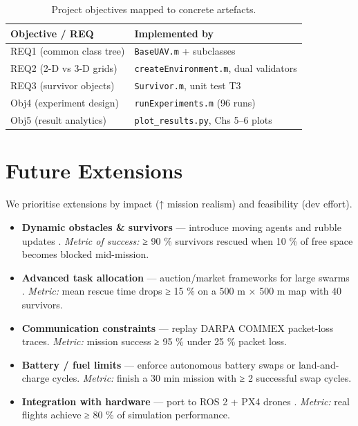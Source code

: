 \documentclass[12pt,a4paper]{report}
\begin{document}
\begin{table}[h]
  \centering
  \caption{Project objectives mapped to concrete artefacts.}
  \label{tab:obj2art}
  \begin{tabular}{@{}ll@{}}
    \toprule
    \textbf{Objective / REQ} & \textbf{Implemented by} \\
    \midrule
    REQ1 (common class tree)  & \texttt{BaseUAV.m} + subclasses \\
    REQ2 (2-D vs 3-D grids)   & \texttt{createEnvironment.m}, dual validators \\
    REQ3 (survivor objects)   & \texttt{Survivor.m}, unit test T3 \\
    Obj4 (experiment design)  & \texttt{runExperiments.m} (96 runs) \\
    Obj5 (result analytics)   & \texttt{plot\_results.py}, Chs 5–6 plots \\
    \bottomrule
  \end{tabular}
\end{table}

\section{Future Extensions}

We prioritise extensions by impact (↑ mission realism) and feasibility
(dev effort).

\begin{itemize}
  \item \textbf{Dynamic obstacles \& survivors} — introduce moving agents and
        rubble updates \cite{Oleynikova2018ReplanDynamic}.  
        \textit{Metric of success:} ≥ 90 \% survivors rescued when
        10 \% of free space becomes blocked mid-mission.
  \item \textbf{Advanced task allocation} — auction/market frameworks for large
        swarms \cite{Dias2006MarketBased,Gerkey2002SoldAuction}.  
        \textit{Metric:} mean rescue time drops ≥ 15 \% on a
        500 m × 500 m map with 40 survivors.
  \item \textbf{Communication constraints} — replay DARPA COMMEX
        packet-loss traces.  
        \textit{Metric:} mission success ≥ 95 \% under 25 \% packet loss.
  \item \textbf{Battery / fuel limits} — enforce autonomous battery swaps or
        land-and-charge cycles.  
        \textit{Metric:} finish a 30 min mission with
        ≥ 2 successful swap cycles.
  \item \textbf{Integration with hardware} — port to ROS 2 + PX4 drones
        \cite{Clothier2015UVWSafetyCase,Sharma2010CooperativeUAV}.  
        \textit{Metric:} real flights achieve ≥ 80 \% of simulation
        performance.
\end{itemize}
\end{document}
